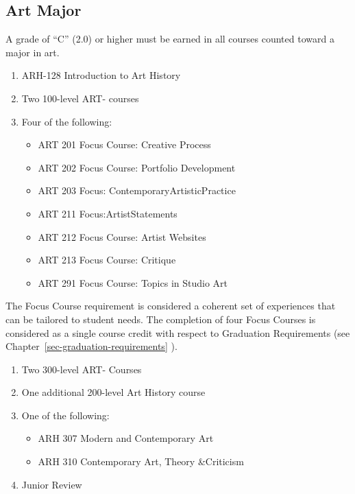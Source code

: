 \documentclass[
  letterpaper,
]{scrbook}
\providecommand{\tightlist}{%
  \setlength{\itemsep}{0pt}\setlength{\parskip}{0pt}}
\begin{document}
\subsection{Art Major}\label{art-major}

A grade of ``C'' (2.0) or higher must be earned in all courses counted
toward a major in art.

\begin{enumerate}
\def\labelenumi{\arabic{enumi}.}
\tightlist
\item
  ARH-128 Introduction to Art History
\item
  Two 100-level ART- courses
\item
  Four of the following:

  \begin{itemize}
  \tightlist
  \item
    ART 201 Focus Course: Creative Process
  \item
    ART 202 Focus Course: Portfolio Development
  \item
    ART 203 Focus: ContemporaryArtisticPractice
  \item
    ART 211 Focus:ArtistStatements
  \item
    ART 212 Focus Course: Artist Websites
  \item
    ART 213 Focus Course: Critique
  \item
    ART 291 Focus Course: Topics in Studio Art
  \end{itemize}
\end{enumerate}

The Focus Course requirement is considered a coherent set of experiences
that can be tailored to student needs. The completion of four Focus
Courses is considered as a single course credit with respect to
Graduation Requirements (see Chapter~\ref{sec-graduation-requirements}
).

\begin{enumerate}
\def\labelenumi{\arabic{enumi}.}
\setcounter{enumi}{3}
\tightlist
\item
  Two 300-level ART- Courses
\item
  One additional 200-level Art History course
\item
  One of the following:

  \begin{itemize}
  \tightlist
  \item
    ARH 307 Modern and Contemporary Art
  \item
    ARH 310 Contemporary Art, Theory \&Criticism
  \end{itemize}
\item
  Junior Review
\end{enumerate}
\end{document}
